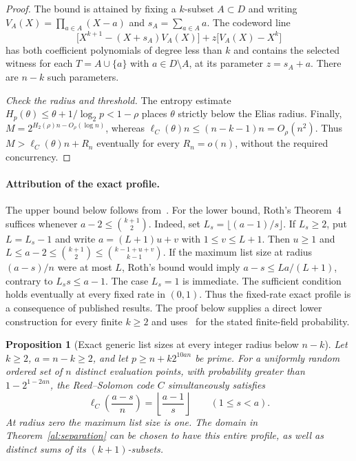 \documentclass[11pt,letterpaper]{article}
\newtheorem{proposition}[theorem]{Proposition}
\theoremstyle{definition}
\theoremstyle{remark}
\begin{document}
\begin{proof}
The bound is attained by fixing a $k$-subset $A\subset D$ and writing
$V_A(X)=\prod_{a\in A}(X-a)$ and $s_A=\sum_{a\in A}a$.
The codeword line
\[
 \bigl[X^{k+1}-(X+s_A)V_A(X)\bigr]
 +z\bigl[V_A(X)-X^k\bigr]
\]
has both coefficient polynomials of degree less than $k$ and contains
the selected witness for each $T=A\cup\{a\}$ with $a\in D\setminus A$,
at its parameter $z=s_A+a$. There are $n-k$ such parameters.

\emph{Check the radius and threshold.}
The entropy estimate $H_p(\theta)\le\theta+1/\log_2p<1-\rho$ places
$\theta$ strictly below the Elias radius. Finally,
$M=2^{H_2(\rho)n-O_\rho(\log n)}$, whereas
$\ell_C(\theta)n\le (n-k-1)n=O_\rho(n^2)$.
Thus $M>\ell_C(\theta)n+R_n$ eventually for every $R_n=o(n)$,
without the required concurrency.
\end{proof}

\paragraph{Attribution of the exact profile.}
The upper bound below follows from~\cite[Theorem~1.5]{bgm}.
For the lower bound, Roth's Theorem~4~\cite{roth} suffices whenever
$a-2\le\binom{k+1}{2}$. Indeed, set $L_s=\lfloor(a-1)/s\rfloor$.
If $L_s\ge2$, put $L=L_s-1$ and write $a=(L+1)u+v$ with
$1\le v\le L+1$. Then $u\ge1$ and
$L\le a-2\le\binom{k+1}{2}\le\binom{k-1+u+v}{k-1}$.
If the maximum list size at radius $(a-s)/n$ were at most $L$,
Roth's bound would imply $a-s\le La/(L+1)$, contrary to
$L_s s\le a-1$. The case $L_s=1$ is immediate.
The sufficient condition holds eventually at every fixed rate in $(0,1)$.
Thus the fixed-rate exact profile is a consequence of published results.
The proof below supplies a direct lower construction for every finite
$k\ge2$ and uses~\cite{aggllz} for the stated finite-field probability.

\begin{proposition}[Exact generic list sizes at every integer radius below $n-k$]
\label{al:profile}
Let $k\ge2$, $a=n-k\ge2$, and let $p\ge n+k2^{10an}$ be prime.
For a uniformly random ordered set of $n$ distinct evaluation points,
with probability greater than $1-2^{1-2an}$, the Reed--Solomon code $C$
simultaneously satisfies
\[
 \ell_C\left(\frac{a-s}{n}\right)
 =\left\lfloor\frac{a-1}{s}\right\rfloor
 \qquad(1\le s<a).
\]
At radius zero the maximum list size is one.
The domain in Theorem~\ref{al:separation} can be chosen to have this
entire profile, as well as distinct sums of its $(k+1)$-subsets.
\end{proposition}
\end{document}
